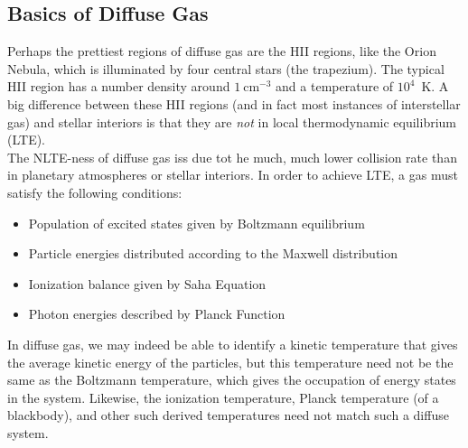 \documentclass[10pt]{article}
\numberwithin{equation}{section}
\newcommand{\n}{\noindent}
\begin{document}
\subsection{Basics of Diffuse Gas} %
\label{sub:basics_of_diffuse_gas}
Perhaps the prettiest regions of diffuse gas are the HII regions, like the Orion Nebula, which is illuminated by four central stars (the trapezium). The typical HII region has a number density around $1\ \mathrm{cm^{-3}}$ and a temperature of $10^4$\ K. A big difference between these HII regions (and in fact most instances of interstellar gas) and stellar interiors is that they are \emph{not} in local thermodynamic equilibrium (LTE).\\

\n The NLTE-ness of diffuse gas iss due tot he much, much lower collision rate than in planetary atmospheres or stellar interiors. In order to achieve LTE, a gas must satisfy the following conditions:
\begin{itemize}
  \item Population of excited states given by Boltzmann equilibrium
  \item Particle energies distributed according to the Maxwell distribution
  \item Ionization balance given by Saha Equation
  \item Photon energies described by Planck Function
\end{itemize}
In diffuse gas, we may indeed be able to identify a kinetic temperature that gives the average kinetic energy of the particles, but this temperature need not be the same as the Boltzmann temperature, which gives the occupation of energy states in the system. Likewise, the ionization temperature, Planck temperature (of a blackbody), and other such derived temperatures need not match such a diffuse system.
\end{document}
